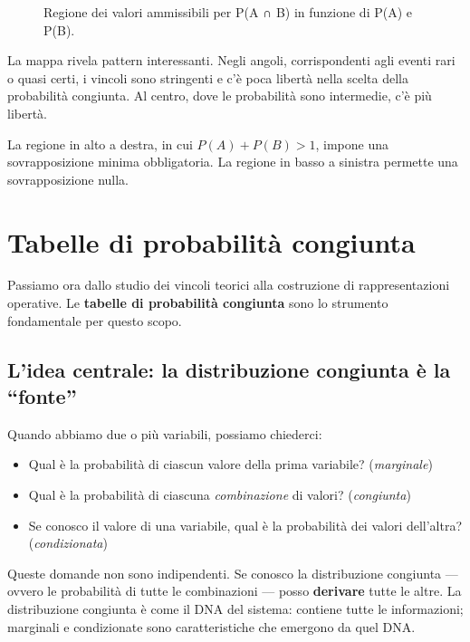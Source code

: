 \documentclass[
  italian,
  letterpaper,
  a4paper,
  11pt,
  open=any]{scrbook}
\providecommand{\tightlist}{%
  \setlength{\itemsep}{0pt}\setlength{\parskip}{0pt}}
\theoremstyle{plain}
\theoremstyle{definition}
\theoremstyle{definition}
\theoremstyle{remark}
\begin{document}
\begin{tcolorbox}
\begin{figure}[H]
{}

\caption{Regione dei valori ammissibili per P(A ∩ B) in funzione di P(A)
e P(B).}

\end{figure}%

La mappa rivela pattern interessanti. Negli angoli, corrispondenti agli
eventi rari o quasi certi, i vincoli sono stringenti e c'è poca libertà
nella scelta della probabilità congiunta. Al centro, dove le probabilità
sono intermedie, c'è più libertà.

La regione in alto a destra, in cui \(P(A) + P(B) > 1\), impone una
sovrapposizione minima obbligatoria. La regione in basso a sinistra
permette una sovrapposizione nulla.

\end{tcolorbox}

\section{Tabelle di probabilità
congiunta}\label{tabelle-di-probabilituxe0-congiunta}

Passiamo ora dallo studio dei vincoli teorici alla costruzione di
rappresentazioni operative. Le \textbf{tabelle di probabilità congiunta}
sono lo strumento fondamentale per questo scopo.

\subsection{L'idea centrale: la distribuzione congiunta è la
``fonte''}\label{lidea-centrale-la-distribuzione-congiunta-uxe8-la-fonte}

Quando abbiamo due o più variabili, possiamo chiederci:

\begin{itemize}
\tightlist
\item
  Qual è la probabilità di ciascun valore della prima variabile?
  (\emph{marginale})
\item
  Qual è la probabilità di ciascuna \emph{combinazione} di valori?
  (\emph{congiunta})
\item
  Se conosco il valore di una variabile, qual è la probabilità dei
  valori dell'altra? (\emph{condizionata})
\end{itemize}

Queste domande non sono indipendenti. Se conosco la distribuzione
congiunta --- ovvero le probabilità di tutte le combinazioni --- posso
\textbf{derivare} tutte le altre. La distribuzione congiunta è come il
DNA del sistema: contiene tutte le informazioni; marginali e
condizionate sono caratteristiche che emergono da quel DNA.
\end{document}
